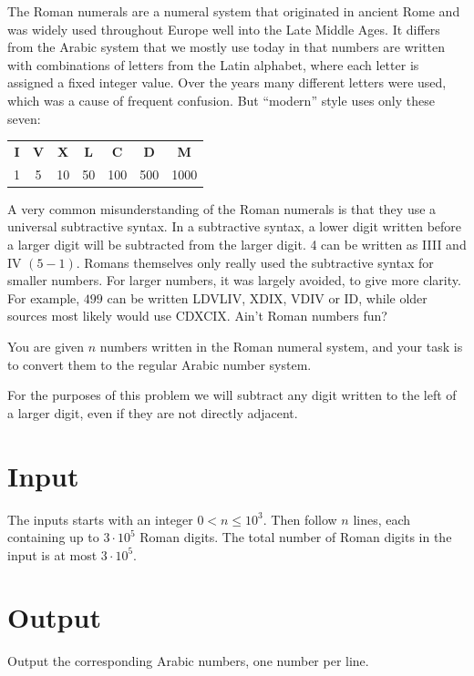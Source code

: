 

The Roman numerals are a numeral system that originated in ancient Rome and was widely used throughout Europe well into
the Late Middle Ages. It differs from the Arabic system that we mostly use today in that numbers are written with combinations
of letters from the Latin alphabet, where each letter is assigned a fixed integer value.  Over the years many different letters were used,
which was a cause of frequent confusion.  But ``modern'' style uses only these seven:

\begin{tabular}{ccccccc}
\textbf{I} & \textbf{V} & \textbf{X} & \textbf{L} & \textbf{C} & \textbf{D} & \textbf{M} \\
1 & 5 & 10 & 50 & 100 & 500 & 1000 \\
\end{tabular}

A very common misunderstanding of the Roman numerals is that they use a universal subtractive syntax. In a subtractive syntax,
a lower digit written before a larger digit will be subtracted from the larger digit. 4 can be written as IIII and IV $(5-1)$. Romans 
themselves only really used the subtractive syntax for smaller numbers. For larger numbers, it was largely avoided, to give more clarity. 
For example, $499$ can be written LDVLIV, XDIX, VDIV or ID, while older sources most
likely would use CDXCIX. Ain't Roman numbers fun?

You are given $n$ numbers written in the Roman numeral system, and your task is to convert them
to the regular Arabic number system.

For the purposes of this problem we will subtract any digit written to the left of a larger digit, even if they are not directly adjacent.

\section*{Input}

The inputs starts with an integer $0 < n \leq 10^3$. Then follow $n$ lines, each
containing up to $3 \cdot 10^5$ Roman digits. The total number
of Roman digits in the input is at most $3 \cdot 10^5$.

\section*{Output}

Output the corresponding Arabic numbers, one number per line.
